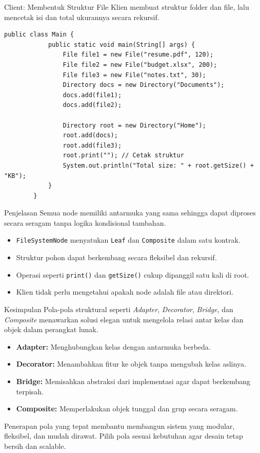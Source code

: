 \documentclass[aspectratio=169, table]{beamer}
\begin{document}
\begin{frame}[fragile]{Client: Membentuk Struktur File}
	\vspace{20pt}
	Klien membuat struktur folder dan file, lalu mencetak isi dan total ukurannya secara rekursif.
	
	\begin{lstlisting}[style=JavaStyle]
		public class Main {
			public static void main(String[] args) {
				File file1 = new File("resume.pdf", 120);
				File file2 = new File("budget.xlsx", 200);
				File file3 = new File("notes.txt", 30);
				Directory docs = new Directory("Documents");
				docs.add(file1);
				docs.add(file2);
				
				Directory root = new Directory("Home");
				root.add(docs);
				root.add(file3);
				root.print(""); // Cetak struktur
				System.out.println("Total size: " + root.getSize() + "KB");
			}
		}
	\end{lstlisting}
\end{frame}

\begin{frame}[fragile]{Penjelasan}
	\vspace{20pt}
	Semua node memiliki antarmuka yang sama sehingga dapat diproses secara seragam tanpa logika kondisional tambahan.
	
	\begin{itemize}
		\item \texttt{FileSystemNode} menyatukan \texttt{Leaf} dan \texttt{Composite} dalam satu kontrak.
		\item Struktur pohon dapat berkembang secara fleksibel dan rekursif.
		\item Operasi seperti \texttt{print()} dan \texttt{getSize()} cukup dipanggil satu kali di root.
		\item Klien tidak perlu mengetahui apakah node adalah file atau direktori.
	\end{itemize}
\end{frame}

\begin{frame}[fragile]{Kesimpulan}
	\vspace{20pt}
	Pola-pola struktural seperti \textit{Adapter}, \textit{Decorator}, \textit{Bridge}, dan \textit{Composite} menawarkan solusi elegan untuk mengelola relasi antar kelas dan objek dalam perangkat lunak.
	
	\vspace{10pt}
	\begin{itemize}
		\item \textbf{Adapter:} Menghubungkan kelas dengan antarmuka berbeda.
		\item \textbf{Decorator:} Menambahkan fitur ke objek tanpa mengubah kelas aslinya.
		\item \textbf{Bridge:} Memisahkan abstraksi dari implementasi agar dapat berkembang terpisah.
		\item \textbf{Composite:} Memperlakukan objek tunggal dan grup secara seragam.
	\end{itemize}
	
	\vspace{10pt}
	Penerapan pola yang tepat membantu membangun sistem yang modular, fleksibel, dan mudah dirawat. Pilih pola sesuai kebutuhan agar desain tetap bersih dan scalable.
\end{frame}
\end{document}
